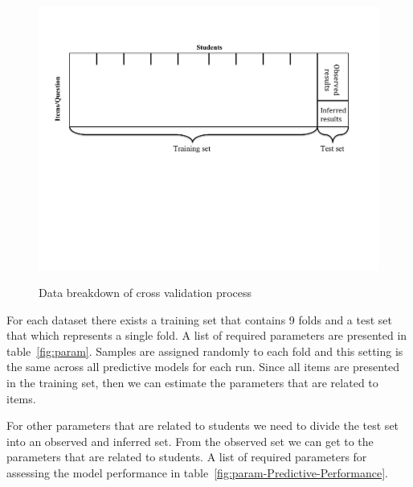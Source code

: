 \begin{figure}
\centering
{\includegraphics[trim=2cm 9cm 2.4cm 2.4cm,clip=true,width=.6\textwidth]{Images/Methodology.pdf}}
\caption{Data breakdown of cross validation process}
\label{figMethod}
\end{figure}

For each dataset there exists a training set that contains 9 folds and a test set that which represents a single fold. A list of required parameters are presented in table~\ref{fig:param}. Samples are assigned randomly to each fold and this setting is the same across all predictive models for each run. Since all items are presented in the training set, then we can estimate the parameters that are related to items. 



For other parameters that are related to students we need to divide the test set into an observed and inferred set. From the observed set we can get to the parameters that are related to students. A list of required parameters for assessing the model performance in table~\ref{fig:param-Predictive-Performance}.


